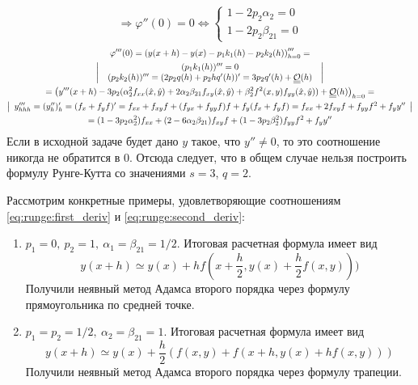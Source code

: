 \begin{example}
\begin{equation}
    \Rightarrow\varphi''(0)=0\Leftrightarrow\begin{cases}
      1-2p_2\alpha_2 = 0 \\
      1-2p_2\beta_{21} = 0
    \end{cases}
  \end{equation}
  \begin{multline*}
    \varphi'''(0)=\left(y(x+h)-y(x)-p_1k_1(h)-p_2k_2(h)\right)'''_{h=0}= \\
    \left|\begin{array}{c}
      (p_1k_1(h))'''=0 \\
      \begin{array}{c}
        (p_2k_2(h))'''=(2p_2q(h)+p_2hq'(h))'=3p_2q'(h)+\underline{\underline{\mathcal{O}}}(h) \\
      \end{array}
    \end{array}\right| \\
    =\left(y'''(x+h)-3p_2(\alpha_2^2f_{xx}(\hat{x},\hat{y})+2\alpha_2\beta_{21}f_{xy}(\hat{x},\hat{y})+\beta_2^2f^2(x,y)f_{yy}(\hat{x},\hat{y}))+\underline{\underline{\mathcal{O}}}(h)\right)_{h=0}= \\
    \left|\begin{array}{c}y'''_{hhh}=(y''_h)'_h=(f_x+f_yf)'=f_{xx}+f_{xy}f+(f_{yx}+f_{yy}f)f+f_y(f_x+f_yf)=f_{xx}+2f_{xy}f+f_{yy}f^2+f_yy''\end{array}\right| \\
    =(1-3p_2\alpha_2^2)f_{xx}+(2-6\alpha_2\beta_{21})f_{xy}f+(1-3p_2\beta_2^2)f_{yy}f^2+f_yy''
  \end{multline*}
  Если в исходной задаче будет дано $y$ такое, что $y''\neq0$, то это соотношение
  никогда не обратится в $0$. Отсюда следует, что в общем случае нельзя построить
  формулу Рунге-Кутта со значениями $s=3$, $q=2$.

  Рассмотрим конкретные примеры, удовлетворяющие соотношениям \eqref{eq:runge:first_deriv} и \eqref{eq:runge:second_deriv}:
  \begin{enumerate}
    \item $p_1=0,\ p_2=1,\ \alpha_1=\beta_{21}=1/2$.
          Итоговая расчетная формула имеет вид
          \[y(x+h)\simeq y(x)+hf(x+\frac{h}{2},y(x)+\frac{h}{2}f(x,y)))\]
          Получили неявный метод Адамса второго порядка через формулу прямоугольника по средней точке.
    \item $p_1=p_2=1/2,\ \alpha_2=\beta_{21}=1$.
          Итоговая расчетная формула имеет вид
          \[y(x+h)\simeq y(x)+\frac{h}{2}(f(x,y)+f(x+h,y(x)+hf(x,y)))\]
          Получили неявный метод Адамса второго порядка через формулу трапеции.
  \end{enumerate}
\end{example}
